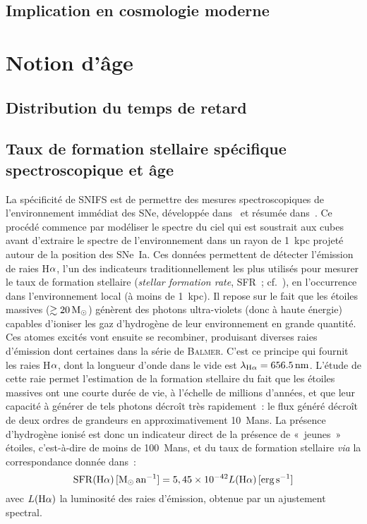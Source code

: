 \documentclass[../main/main.tex]{subfiles}
\begin{document}
\subsection{Implication en cosmologie moderne}\label{sssec:mcosmo}

\section{Notion d'âge}\label{ssec:spectro}
\subsection{Distribution du temps de retard}\label{sssec:dtd}
\subsection{Taux de formation stellaire spécifique
spectroscopique et âge}\label{ssec:lssfr}

La spécificité de SNIFS est de permettre des mesures spectroscopiques de
l'environnement immédiat des SNe, développée dans~\cite{rigault2013} et résumée
dans~\cite{rigault2020}. Ce procédé commence par modéliser le spectre du ciel
qui est soustrait aux cubes avant d'extraire le spectre de l'environnement dans
un rayon de \SI{1}{kpc} projeté autour de la position des SNe~Ia. Ces données
permettent de détecter l'émission de raies H$\a$, l'un des indicateurs
traditionnellement les plus utilisés pour mesurer le taux de formation stellaire
(\textit{stellar formation rate}, SFR~; cf.~\cite{kennicutt1998}), en
l'occurrence dans l'environnement local (à moins de \SI{1}{kpc}). Il repose sur
le fait que les étoiles massives ($\gtrsim \SI{20}{\Msun}$) génèrent des photons
ultra-violets (donc à haute énergie) capables d'ioniser les gaz d'hydrogène de
leur environnement \citep{calzetti2013} en grande quantité. Ces atomes excités
vont ensuite se recombiner, produisant diverses raies d'émission dont certaines
dans la série de \textsc{Balmer}. C'est ce principe qui fournit les raies H$\a$,
dont la longueur d'onde dans le vide est $\lambda_{\mathrm{H}\a} =
\SI{656.5}{nm}$. L'étude de cette raie permet l'estimation de la formation
stellaire du fait que les étoiles massives ont une courte durée de vie, à
l'échelle de millions d'années, et que leur capacité à générer de tels photons
décroît très rapidement~: le flux généré décroît de deux ordres de grandeurs
en approximativement \SI{10}{Mans}. La présence d'hydrogène ionisé est donc un
indicateur direct de la présence de «~jeunes~» étoiles, c'est-à-dire de moins de
\SI{100}{Mans}, et du taux de formation stellaire \textit{via} la
correspondance donnée dans~\cite{calzetti2013}:
\begin{equation}\label{eq:sfrha}
    \mathrm{SFR}(\mathrm{H}\alpha)\,[\si{\Msun.an^{-1}}] =
    5,45\times 10^{-42}L(\mathrm{H}\a)\,[\si{erg.s^{-1}}]
\end{equation}
avec $L(\mathrm{H}\a)$ la luminosité des raies d'émission, obtenue par un
ajustement spectral.
\end{document}
